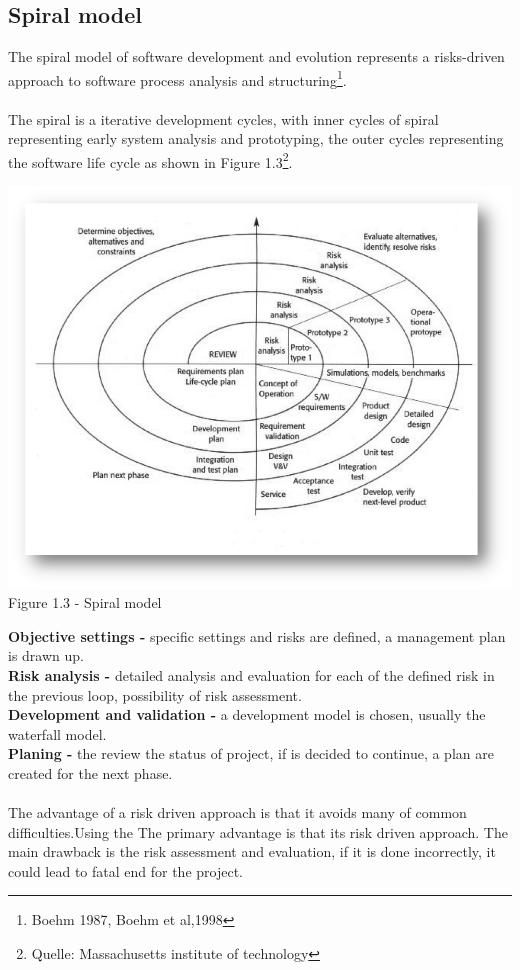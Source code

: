 \subsection{Spiral model}
The spiral model of software development and evolution represents a risks-driven approach to software process analysis and structuring\footnote{Boehm 1987, Boehm et al,1998}.\\ \\The spiral is a iterative development cycles, with inner cycles of spiral representing early system analysis and prototyping, the outer cycles representing the software life cycle as shown in Figure 1.3\footnote{Quelle: Massachusetts institute of technology}.\\
\begin{center}
\includegraphics[scale=0.75]{Images/Spiral_model.png}\\
Figure 1.3 - Spiral model
\end{center}
{\bf Objective settings -} specific settings and risks are defined, a management plan is drawn up.\\
{\bf Risk analysis -} detailed analysis and evaluation for each of the defined risk in the previous loop, possibility of risk assessment.\\
{\bf Development and validation -} a development model is chosen, usually the waterfall model.\\
{\bf Planing -}  the review the status of project, if is decided to continue, a plan are created for the next phase.\\
\\
The advantage of a risk driven approach is that it avoids many of common difficulties.Using the The primary advantage is that its risk driven approach. The main drawback is the risk assessment and evaluation, if it is done incorrectly, it could lead to fatal end for the project.

















